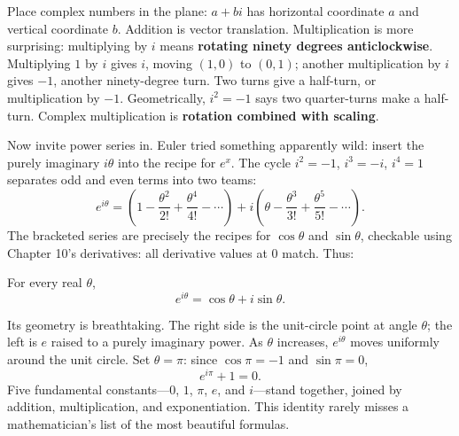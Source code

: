 Place complex numbers in the plane: $a+bi$ has horizontal coordinate $a$ and vertical coordinate $b$. Addition is vector translation. Multiplication is more surprising: multiplying by $i$ means \textbf{rotating ninety degrees anticlockwise}. Multiplying $1$ by $i$ gives $i$, moving $(1,0)$ to $(0,1)$; another multiplication by $i$ gives $-1$, another ninety-degree turn. Two turns give a half-turn, or multiplication by $-1$. Geometrically, $i^2=-1$ says two quarter-turns make a half-turn. Complex multiplication is \textbf{rotation combined with scaling}.

Now invite power series in. Euler tried something apparently wild: insert the purely imaginary $i\theta$ into the recipe for $e^x$. The cycle $i^2=-1$, $i^3=-i$, $i^4=1$ separates odd and even terms into two teams:
\[
e^{i\theta}=\left(1-\frac{\theta^2}{2!}+\frac{\theta^4}{4!}-\cdots\right)
+i\left(\theta-\frac{\theta^3}{3!}+\frac{\theta^5}{5!}-\cdots\right).
\]
The bracketed series are precisely the recipes for $\cos\theta$ and $\sin\theta$, checkable using Chapter 10's derivatives: all derivative values at $0$ match. Thus:

\begin{dingli}
For every real $\theta$,
\[
e^{i\theta}=\cos\theta+i\sin\theta .
\]
\end{dingli}

Its geometry is breathtaking. The right side is the unit-circle point at angle $\theta$; the left is $e$ raised to a purely imaginary power. As $\theta$ increases, $e^{i\theta}$ moves uniformly around the unit circle. Set $\theta=\pi$: since $\cos\pi=-1$ and $\sin\pi=0$,
\[
e^{i\pi}+1=0 .
\]
Five fundamental constants---$0$, $1$, $\pi$, $e$, and $i$---stand together, joined by addition, multiplication, and exponentiation. This identity rarely misses a mathematician's list of the most beautiful formulas.

\begin{center}
\end{center}

